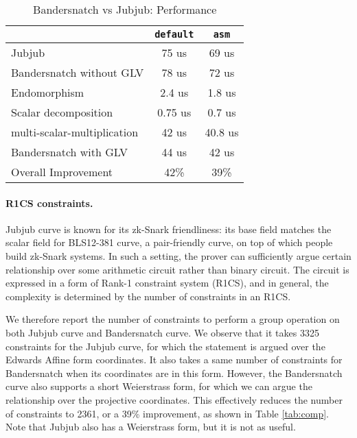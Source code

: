 \documentclass{article}
\newcommand{\ZZ}[1]{\color{cyan}#1\color{black}}
\theoremstyle{definition}
\begin{document}
\begin{table}[h] %
  \centering
  
  \begin{tabular}{|l|c|c|}\hline
      & \texttt{default} & \texttt{asm}\\\hline\hline
    Jubjub & 75 us & 69 us \\\hline
    Bandersnatch without GLV & 78 us & 72 us  \\\hline\hline   
    Endomorphism & 2.4 us& 1.8 us\\\hline
    Scalar decomposition & 0.75 us & 0.7 us \\\hline
    multi-scalar-multiplication & 42 us &  40.8 us\\\hline
    Bandersnatch with GLV& 44 us & 42 us \\\hline\hline
    Overall Improvement & 42\% & 39\% \\\hline
  \end{tabular}
  \caption{Bandersnatch vs Jubjub: Performance}
  \label{tab:comp_full}
\end{table}

\paragraph{R1CS constraints.}
Jubjub curve is known for its zk-Snark friendliness: its 
base field matches the scalar field for BLS12-381 curve, a 
pair-friendly curve, on top of which people build zk-Snark
systems.
In such a setting, the prover can sufficiently argue certain 
relationship over some arithmetic circuit rather than binary
circuit.
The circuit is expressed in a form of Rank-1 constraint system
(R1CS), and in general, the complexity is determined by the 
number of constraints in an R1CS. 

We therefore report the number of constraints to perform
a group operation on both Jubjub curve and Bandersnatch 
curve. We observe that it takes 3325 constraints for the 
Jubjub curve, for which the statement is argued over 
the Edwards Affine form coordinates. 
It also takes a same number of constraints
for Bandersnatch when its coordinates are in this form. 
However, the Bandersnatch curve also supports a 
short Weierstrass form, for which we can argue the 
relationship over the projective coordinates.
This effectively reduces the number of constraints to
2361, or a 39\% improvement, as shown in Table \ref{tab:comp}.
Note that Jubjub also has a Weierstrass form, but it is 
not as useful. 
  
\end{document}
